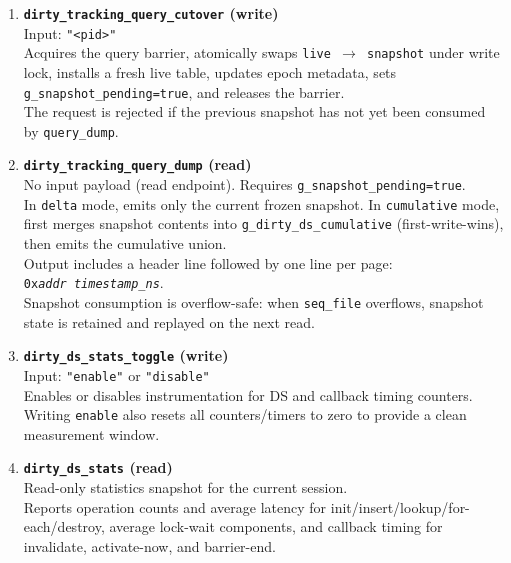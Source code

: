 \begin{enumerate}
    \item \textbf{\texttt{dirty\_tracking\_query\_cutover} (write)} \\ 
          Input: \texttt{"<pid>"}\\
          Acquires the query barrier, atomically swaps
          \texttt{live $\rightarrow$ snapshot} under write lock, installs a
          fresh live table, updates epoch metadata, sets
          \texttt{g\_snapshot\_pending=true}, and releases the barrier.\\
          The request is rejected if the previous snapshot has not yet been
          consumed by \texttt{query\_dump}.\\

    \item \textbf{\texttt{dirty\_tracking\_query\_dump} (read)} \\ 
          No input payload (read endpoint). Requires
          \texttt{g\_snapshot\_pending=true}.\\
          In \texttt{delta} mode, emits only the current frozen snapshot.
          In \texttt{cumulative} mode, first merges snapshot contents into
          \texttt{g\_dirty\_ds\_cumulative} (first-write-wins), then emits the
          cumulative union.\\
          Output includes a header line followed by one line per page:
          \texttt{0x\textit{addr}\ \textit{timestamp\_ns}}.\\
          Snapshot consumption is overflow-safe: when \texttt{seq\_file}
          overflows, snapshot state is retained and replayed on the next read.\\

    \item \textbf{\texttt{dirty\_ds\_stats\_toggle} (write)} \\ 
          Input: \texttt{"enable"} or \texttt{"disable"}\\
          Enables or disables instrumentation for DS and callback timing
          counters. Writing \texttt{enable} also resets all counters/timers to
          zero to provide a clean measurement window.\\

    \item \textbf{\texttt{dirty\_ds\_stats} (read)} \\ 
          Read-only statistics snapshot for the current session.\\
          Reports operation counts and average latency for
          init/insert/lookup/for-each/destroy, average lock-wait components,
          and callback timing for invalidate, activate-now, and barrier-end.\\


\end{enumerate}
